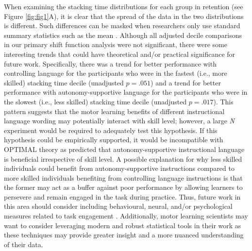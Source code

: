 \documentclass[doc,floatsintext,donotrepeattitle,letterpaper,12pt]{apa7}
\begin{document}
When examining the stacking time distributions for each group in retention (see Figure \ref{fig:fig1}A), it is clear that the spread of the data in the two distributions is different. Such differences can be masked when researchers only use standard summary statistics such as the mean \autocite[see][for the famous Anscombe's quartet example]{anscombe1973}. Although all adjusted decile comparisons in our primary shift function analysis were not significant, there were some interesting trends that could have theoretical and/or practical significance for future work. Specifically, there was a trend for better performance with controlling language for the participants who were in the fastest (i.e., more skilled) stacking time decile (unadjusted $p = .051$) and a trend for better performance with autonomy-supportive language for the participants who were in the slowest (i.e., less skilled) stacking time decile (unadjusted $p = .017$). This pattern suggests that the motor learning benefits of different instructional language wording may potentially interact with skill level; however, a large \emph{N} experiment would be required to adequately test this hypothesis. If this hypothesis could be empirically supported, it would be incompatible with OPTIMAL theory as \textcite{wulf2016} predicted that autonomy-supportive instructional language is beneficial irrespective of skill level. A possible explanation for why less skilled individuals could benefit from autonomy-supportive instructions compared to more skilled individuals benefiting from controlling language instructions is that the former may act as a buffer against poor performance by allowing learners to persevere and remain engaged in the task during practice. Thus, future work in this area should consider including behavioural, neural, and/or psychological measures related to task engagement \autocite[e.g.,][]{fairclough2009,leiker2016,obrien2009}. Additionally, motor learning scientists may want to consider leveraging modern and robust statistical tools \autocite{wilcox2021} in their work as these techniques may provide greater insight and a more nuanced understanding of their data.
\end{document}
